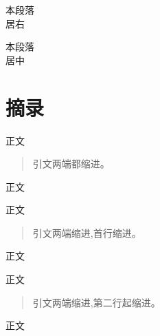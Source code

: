 \documentclass[a4paper,12pt,draft]{report} %
\begin{document}
  \begin{flushright} 
  本段落\\
居右 
  \end{flushright}
 
 \begin{center} 
 本段落\\
居中 
 \end{center}
 
\section{摘录}
正文
\begin{quote}
引文两端都缩进。
\end{quote}
正文

正文
\begin{quotation}
引文两端缩进,首行缩进。
\end{quotation}
正文

正文
\begin{verse}
引文两端缩进,第二行起缩进。
\end{verse}
正文
\end{document}
